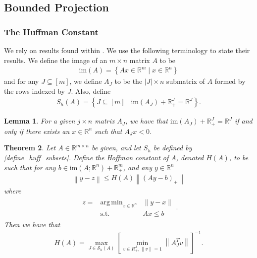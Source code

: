 \documentclass{article}
\newtheorem{theorem}{Theorem}[section]
\newtheorem{lemma}[theorem]{Lemma}
\theoremstyle{case}
\numberwithin{theorem}{subsection}
\DeclareMathOperator*{\argmin}{arg\,min}
\newcommand{\reals}{\mathbb R}
\newcommand{\Rm}{\mathbb R^m}
\newcommand{\Rn}{\mathbb R^n}
\newcommand{\image}{{\textrm{im}}}
\begin{document}
\subsection{Bounded Projection}

\subsubsection{The Huffman Constant}

We rely on results found within \cite{pena2020new}.
We use the following terminology to state their results.
We define the image of an $m\times n$ matrix $A$ to be
\begin{align}
\image(A) = \left\{Ax \in \Rm \;|\; x \in \Rn \right\} \label{define_image}
\end{align}
and for any $J \subseteq [m]$, we define $A_J$ to be the $|J| \times n$ submatrix of $A$ 
formed by the rows indexed by $J$.
Also, define 
\begin{align}
S_h(A) = \left\{J \subseteq [m] \; | \; \image(A_J) + \reals_+^J = \reals^J \right\}. \label{define_huff_subsets}
\end{align}

\begin{lemma}
For a given $j \times n$ matrix $A_J$, we have that 
$\image(A_J) + \reals_+^J = \reals^J$
if and only if there exists an $x \in \Rn$ such that
$A_J x < 0$.
\end{lemma}


\begin{theorem}
\label{hoffman_theorem}
Let $A \in \mathbb R^{m \times n}$ be given, and let $S_h$ be defined by \cref{define_huff_subsets}.
Define the Hoffman constant of $A$, denoted $H(A)$, to be such that for any 
$b \in \image(A; \Rn) + \reals^m_+$, and any $y \in \Rn$
\begin{align*}
\left\|y - z\right\| \le H(A) \left\|\left(Ay - b\right)_+\right\|
\end{align*}
where
\begin{align*}
\begin{array}{ccc}
z = & \argmin_{x \in \Rn} & \|y - x\| \\
      & \textrm{s.t.}    & Ax \le b
\end{array}.
\end{align*}
Then we have that
\begin{align*}
H(A) = \max_{J \in \mathcal S_h(A)} \left[\min_{v \in R^J_+, \|v\| = 1}  \left\|A_J^Tv\right\| \right]^{-1}.
\end{align*}
\end{theorem}
\end{document}
